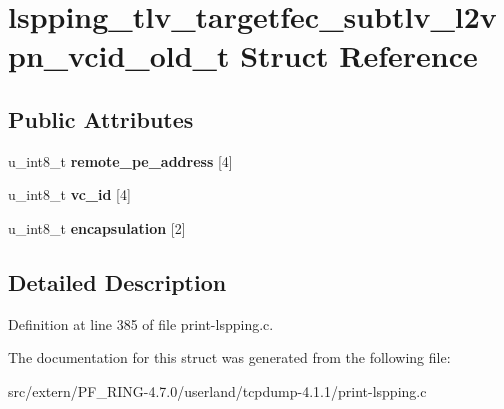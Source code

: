 \hypertarget{structlspping__tlv__targetfec__subtlv__l2vpn__vcid__old__t}{
\section{lspping\_\-tlv\_\-targetfec\_\-subtlv\_\-l2vpn\_\-vcid\_\-old\_\-t Struct Reference}
\label{structlspping__tlv__targetfec__subtlv__l2vpn__vcid__old__t}
}
\subsection*{Public Attributes}
\begin{DoxyCompactItemize}
\item 
\hypertarget{structlspping__tlv__targetfec__subtlv__l2vpn__vcid__old__t_a55f9280bc27e1e36fbf10cddd8456b24}{
u\_\-int8\_\-t {\bfseries remote\_\-pe\_\-address} \mbox{[}4\mbox{]}}
\label{structlspping__tlv__targetfec__subtlv__l2vpn__vcid__old__t_a55f9280bc27e1e36fbf10cddd8456b24}

\item 
\hypertarget{structlspping__tlv__targetfec__subtlv__l2vpn__vcid__old__t_acb1a3c075ebe0b89e12ee262932234ef}{
u\_\-int8\_\-t {\bfseries vc\_\-id} \mbox{[}4\mbox{]}}
\label{structlspping__tlv__targetfec__subtlv__l2vpn__vcid__old__t_acb1a3c075ebe0b89e12ee262932234ef}

\item 
\hypertarget{structlspping__tlv__targetfec__subtlv__l2vpn__vcid__old__t_a05e188c39032b7d434862f04533cf9d8}{
u\_\-int8\_\-t {\bfseries encapsulation} \mbox{[}2\mbox{]}}
\label{structlspping__tlv__targetfec__subtlv__l2vpn__vcid__old__t_a05e188c39032b7d434862f04533cf9d8}

\end{DoxyCompactItemize}


\subsection{Detailed Description}


Definition at line 385 of file print-\/lspping.c.



The documentation for this struct was generated from the following file:\begin{DoxyCompactItemize}
\item 
src/extern/PF\_\-RING-\/4.7.0/userland/tcpdump-\/4.1.1/print-\/lspping.c\end{DoxyCompactItemize}
